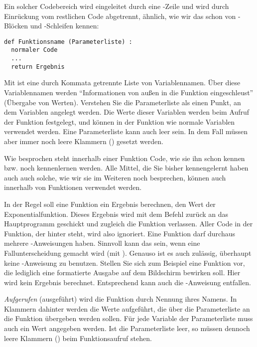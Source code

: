 Ein solcher Codebereich wird eingeleitet durch eine -Zeile und wird durch Einrückung vom restlichen Code abgetrennt, ähnlich, wie wir das schon von -Blöcken und -Schleifen kennen:

\begin{codebox}
\begin{verbatim}
def Funktionsname (Parameterliste) :
  normaler Code
  ...
  return Ergebnis
\end{verbatim}
\end{codebox}

Mit  ist eine durch Kommata getrennte Liste von Variablennamen. Über diese Variablennamen werden \enquote{Informationen von außen in die Funktion eingeschleust} (Übergabe von Werten). Verstehen Sie die Parameterliste als einen Punkt, an dem Variablen angelegt werden. Die Werte dieser Variablen werden beim Aufruf der Funktion festgelegt, und können in der Funktion wie normale Variablen verwendet werden. Eine Parameterliste kann auch leer sein. In dem Fall müssen aber immer noch  leere Klammern () gesetzt werden.

Wie besprochen steht innerhalb einer Funktion Code, wie sie ihn schon kennen bzw. noch kennenlernen werden. Alle Mittel, die Sie bisher kennengelernt haben auch auch solche, wie wir sie im Weiteren noch besprechen, können auch innerhalb von Funktionen verwendet werden.

In der Regel soll eine Funktion ein Ergebnis berechnen, \eg den Wert der Exponentialfunktion. Dieses Ergebnis wird mit dem Befehl  zurück an das Hauptprogramm geschickt und zugleich die Funktion verlassen. Aller Code in der Funktion, der hinter  steht, wird also ignoriert. Eine Funktion darf durchaus mehrere -Anweisungen haben. Sinnvoll kann das sein, wenn eine Fallunterscheidung gemacht wird (\eg mit ). Genauso ist es auch zulässig, überhaupt keine -Anweisung zu benutzen. Stellen Sie sich zum Beispiel eine Funktion vor, die lediglich eine formatierte Ausgabe auf dem Bildschirm bewirken soll. Hier wird kein Ergebnis berechnet. Entsprechend kann auch die -Anweisung entfallen.

\emph{Aufgerufen} (\ie ausgeführt) wird die Funktion durch Nennung ihres Namens. In Klammern dahinter werden die Werte aufgeführt, die über die Parameterliste an die Funktion übergeben werden sollen. Für jede Variable der Parameterliste muss auch ein Wert angegeben werden. Ist die Parameterliste leer, so müssen dennoch leere Klammern () beim Funktionsaufruf stehen.

